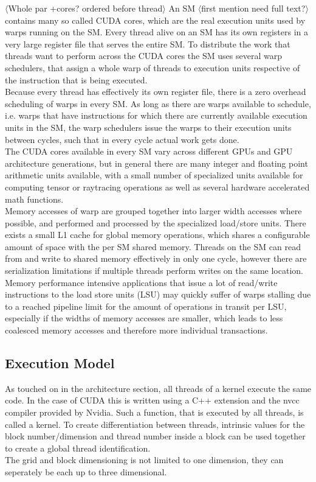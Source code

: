 \documentclass{tudscrreprt}
\newcommand{\markr}[1]{\textcolor{review}{$\langle$#1$\rangle$}}
\begin{document}
				\markr{Whole par +cores? ordered before thread} An SM \markr{first mention need full text?} contains many so called CUDA cores, which are the real execution units used by warps running on the SM. Every thread alive on an SM has its own registers in a very large register file that serves the entire SM. To distribute the work that threads want to perform across the CUDA cores the SM uses several warp schedulers, that assign a whole warp of threads to execution units respective of the instruction that is being executed. \\
				Because every thread has effectively its own register file, there is a zero overhead scheduling of warps in every SM. As long as there are warps available to schedule, i.e. warps that have instructions for which there are currently available execution units in the SM, the warp schedulers issue the warps to their execution units between cycles, such that in every cycle actual work gets done. \\
				
				The CUDA cores available in every SM vary across different GPUs and GPU architecture generations, but in general there are many integer and floating point arithmetic units available, with a small number of specialized units available for computing tensor or raytracing operations as well as several hardware accelerated math functions. \\
				
				Memory accesses of warp are grouped together into larger width accesses where possible, and performed and processed by the specialized load/store units. There exists a small L1 cache for global memory operations, which shares a configurable amount of space with the per SM shared memory. Threads on the SM can read from and write to shared memory effectively in only one cycle, however there are serialization limitations if multiple threads perform writes on the same location. \\
				Memory performance intensive applications that issue a lot of read/write instructions to the load store units (LSU) may quickly suffer of warps stalling due to a reached pipeline limit for the amount of operations in transit per LSU, especially if the widths of memory accesses are smaller, which leads to less coalesced memory accesses and therefore more individual transactions. \\
			
			\subsection{Execution Model}
				As touched on in the architecture section, all threads of a kernel execute the same code. In the case of CUDA this is written using a C++ extension and the nvcc compiler provided by Nvidia. Such a function, that is executed by all threads, is called a kernel. To create differentiation between threads, intrinsic values for the block number/dimension and thread number inside a block can be used together to create a global thread identification. \\
				The grid and block dimensioning is not limited to one dimension, they can seperately be each up to three dimensional. \\
				
\end{document}
